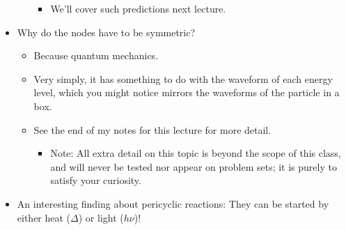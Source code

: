 \documentclass[../notes.tex]{subfiles}
\begin{document}
\begin{itemize}
\begin{itemize}
\begin{itemize}
            \item We'll cover such predictions next lecture.
        \end{itemize}
    \end{itemize}
    \item Why do the nodes have to be symmetric?
    \begin{itemize}
        \item Because quantum mechanics.
        \item Very simply, it has something to do with the waveform of each energy level, which you might notice mirrors the waveforms of the particle in a box.
        \item See the end of my notes for this lecture for more detail.
        \begin{itemize}
            \item Note: All extra detail on this topic is beyond the scope of this class, and will never be tested nor appear on problem sets; it is purely to satisfy your curiosity.
        \end{itemize}
    \end{itemize}
    \item An interesting finding about pericyclic reactions: They can be started by either heat ($\Delta$) or light ($h\nu$)!
    \begin{figure}[h!]
        \centering
\end{figure}
\end{itemize}
\end{document}
